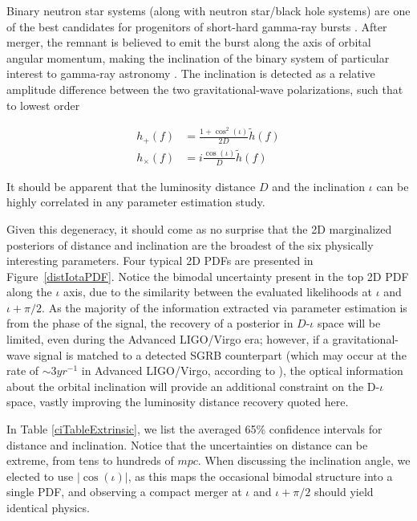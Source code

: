 \documentclass[11pt,a4paper]{emulateapj}
\newcommand{\carl}[1]{{\color{red}  #1}}
\begin{document}
Binary neutron star systems (along with neutron star/black hole systems) are one of the best candidates for progenitors of short-hard gamma-ray bursts \citep[and references therein]{Nakar2007}.  After merger, the remnant is believed to emit the burst along the axis of orbital angular momentum, making the inclination of the binary system of particular interest to gamma-ray astronomy \citep{LSCGRB2010,Corsi2012}.  The inclination is detected as a relative amplitude difference between the two gravitational-wave polarizations, such that to lowest order

\begin{align}
h_+(f) &= \frac{1+\cos^2(\iota)}{2 D} \tilde{h}(f) \nonumber \\
h_\times(f) &= i \frac{\cos(\iota)}{D}\tilde{h}(f)
\end{align}

\noindent It should be apparent that the luminosity distance $D$ and the inclination $\iota$ can be highly correlated in any parameter estimation study.

Given this degeneracy, it should come as no surprise that the 2D marginalized posteriors of distance
 and inclination are the broadest of the six physically interesting parameters.  Four typical 2D PDFs are
  presented in Figure~\ref{distIotaPDF}.  Notice the bimodal uncertainty 
present in the top 2D PDF along the $\iota$ axis, due to the similarity between the evaluated
 likelihoods at $\iota$ and $\iota + \pi/2$.  As the majority of the information extracted via parameter 
 estimation is from the phase of the signal, the recovery of a posterior in $D$-$\iota$ space will be 
 limited, even during the Advanced LIGO/Virgo era; however, if a gravitational-wave signal is 
 matched to a detected SGRB counterpart (which may occur at the rate of $\sim 3 yr^{-1}$ in Advanced LIGO/Virgo, 
 according to \cite{Metzger2013}), the optical information about the orbital inclination
 will provide an additional constraint on the D-$\iota$ space, vastly improving the luminosity distance recovery
 quoted here.
 
 
In Table \ref{ciTableExtrinsic}, we list the averaged 65\% confidence intervals for distance and inclination.  
Notice that the uncertainties on distance can be extreme, from tens to hundreds of $mpc$.  When discussing
the inclination angle, we elected to use $|\cos(\iota)|$, as this maps the occasional bimodal structure into
a single PDF, 
 and observing a compact merger at $\iota$ and $\iota + \pi/2$ should yield identical physics.  
\end{document}
